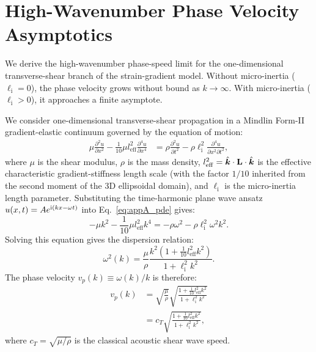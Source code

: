 \section{High-Wavenumber Phase Velocity Asymptotics}
\label{app:asymptotics}

We derive the high-wavenumber phase-speed limit for the one-dimensional transverse-shear branch of the strain-gradient model. Without micro-inertia ($\ell_{\mathrm{i}}=0$), the phase velocity grows without bound as $k\to\infty$. With micro-inertia ($\ell_{\mathrm{i}}>0$), it approaches a finite asymptote.

We consider one-dimensional transverse-shear propagation in a Mindlin Form-II gradient-elastic continuum governed by the equation of motion:
\begin{equation}
\begin{split}
\mu \frac{\partial^2 u}{\partial x^2} - \frac{1}{10} \mu l_{\mathrm{eff}}^2 \frac{\partial^4 u}{\partial x^4}
&= \rho \frac{\partial^2 u}{\partial t^2} - \rho \ell_{\mathrm{i}}^2 \frac{\partial^4 u}{\partial x^2 \partial t^2},
\end{split}
\label{eq:appA_pde}
\end{equation}
where $\mu$ is the shear modulus, $\rho$ is the mass density, $l_{\mathrm{eff}}^2 = \hat{\bm{k}}\cdot\mathbf{L}\cdot\hat{\bm{k}}$ is the effective characteristic gradient-stiffness length scale (with the factor $1/10$ inherited from the second moment of the 3D ellipsoidal domain), and $\ell_{\mathrm{i}}$ is the micro-inertia length parameter. Substituting the time-harmonic plane wave ansatz $u(x, t) = A e^{\mathrm{i}(k x - \omega t)}$ into Eq.~\eqref{eq:appA_pde} gives:
\begin{equation}
-\mu k^2 - \frac{1}{10} \mu l_{\mathrm{eff}}^2 k^4 = -\rho \omega^2 - \rho \ell_{\mathrm{i}}^2 \omega^2 k^2.
\label{eq:appA_char}
\end{equation}
Solving this equation gives the dispersion relation:
\begin{equation}
\omega^2(k) = \frac{\mu}{\rho} \frac{k^2 \left( 1 + \frac{1}{10} l_{\mathrm{eff}}^2 k^2 \right)}{1 + \ell_{\mathrm{i}}^2 k^2}.
\label{eq:appA_dispersion}
\end{equation}
The phase velocity $v_p(k) \equiv \omega(k)/k$ is therefore:
\begin{equation}
\begin{split}
v_p(k) &= \sqrt{\frac{\mu}{\rho}} \sqrt{\frac{1 + \frac{1}{10} l_{\mathrm{eff}}^2 k^2}{1 + \ell_{\mathrm{i}}^2 k^2}} \\
&= c_T \sqrt{\frac{1 + \frac{1}{10} l_{\mathrm{eff}}^2 k^2}{1 + \ell_{\mathrm{i}}^2 k^2}},
\end{split}
\label{eq:appA_vp}
\end{equation}
where $c_T = \sqrt{\mu/\rho}$ is the classical acoustic shear wave speed.


